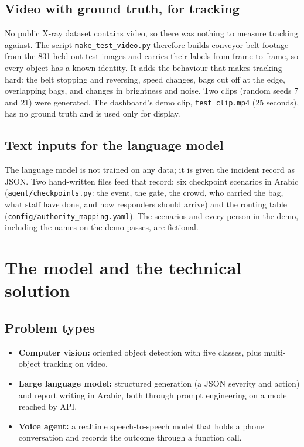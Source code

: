 \documentclass[11pt,a4paper]{article}
\newcommand{\code}[1]{\texttt{#1}}
\begin{document}
\subsection{Video with ground truth, for tracking}

No public X-ray dataset contains video, so there was nothing to measure tracking against. The
script \code{make\_test\_video.py} therefore builds conveyor-belt footage from the 831 held-out test images and
carries their labels from frame to frame, so every object has a known identity. It adds the
behaviour that makes tracking hard: the belt stopping and reversing, speed changes, bags cut off at
the edge, overlapping bags, and changes in brightness and noise. Two clips (random seeds 7 and 21)
were generated. The dashboard's demo clip, \code{test\_clip.mp4} (25 seconds), has no ground truth
and is used only for display.

\subsection{Text inputs for the language model}

The language model is not trained on any data; it is given the incident record as JSON. Two
hand-written files feed that record: six checkpoint scenarios in Arabic (\code{agent/checkpoints.py}:
the event, the gate, the crowd, who carried the bag, what staff have done, and how responders should
arrive) and the routing table (\code{config/authority\_mapping.yaml}). The scenarios and every person in
the demo, including the names on the demo passes, are fictional.

\section{The model and the technical solution}

\subsection{Problem types}

\begin{itemize}
  \item \textbf{Computer vision:} oriented object detection with five classes, plus multi-object
        tracking on video.
  \item \textbf{Large language model:} structured generation (a JSON severity and action) and
        report writing in Arabic, both through prompt engineering on a model reached by API.
  \item \textbf{Voice agent:} a realtime speech-to-speech model that holds a phone conversation and
        records the outcome through a function call.
\end{itemize}
\end{document}
